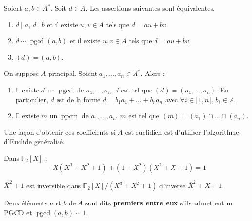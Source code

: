   \begin{proposition}
    Soient $a, b \in A^*$. Soit $d \in A$. Les assertions suivantes sont équivalentes.
    \begin{enumerate}[label={\bfseries(\roman*)}]
      \item $d \mid a$, $d \mid b$ et il existe $u, v \in A$ tels que $d = au + bv$.
      \item $d \sim \operatorname{pgcd}(a, b)$ et il existe $u, v \in A$ tels que $d = au + bv$.
      \item $(d) = (a,b)$.
    \end{enumerate}
  \end{proposition}

  \begin{theorem}
    On suppose $A$ principal. Soient $a_1, \dots, a_n \in A^*$. Alors :
    \begin{enumerate}[label={\bfseries(\roman*)}]
      \item Il existe $d$ un $\operatorname{pgcd}$ de $a_1, \dots, a_n$. $d$ est tel que $(d) = (a_1, \dots, a_n)$. En particulier, $d$ est de la forme $d = b_1 a_1 + \dots + b_n a_n$ avec $\forall i \in \llbracket 1, n \rrbracket, \, b_i \in A$.
      \item Il existe $m$ un $\operatorname{ppcm}$ de $a_1, \dots, a_n$. $m$ est tel que $(m) = (a_1) \cap \dots \cap (a_n)$.
    \end{enumerate}
  \end{theorem}

  \begin{remark}
    Une façon d'obtenir ces coefficients si $A$ est euclidien est d'utiliser l'algorithme d'Euclide généralisé.
  \end{remark}


  \begin{example}
    Dans $\mathbb{F}_2[X]$ :
    \[ -X(X^3+X^2+1) + (1+X^2)(X^2+X+1) = 1 \]
  \end{example}

  \begin{application}
    $\overline{X}^2+1$ est inversible dans $\mathbb{F}_2[X]/(X^3 + X^2 + 1)$ d'inverse $\overline{X}^2+X+1$.
  \end{application}


  \begin{definition}
    Deux éléments $a$ et $b$ de $A$ sont dits \textbf{premiers entre eux} s'ils admettent un PGCD et $\operatorname{pgcd}(a,b) \sim 1$.
  \end{definition}

